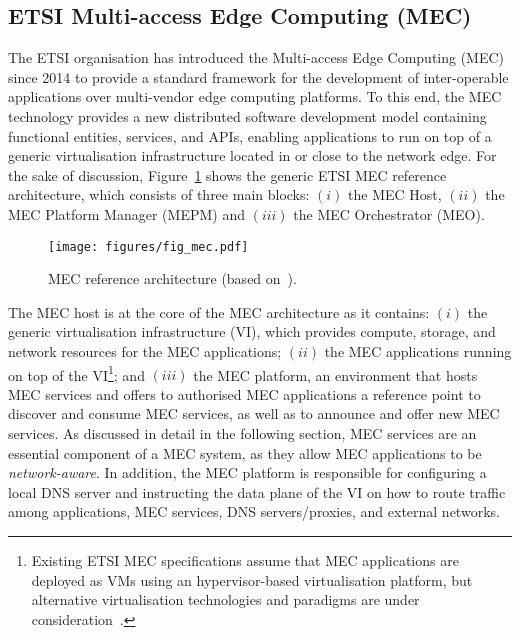 \subsection{ETSI Multi-access Edge Computing (MEC)}
\label{sec:mec}
\noindent
The ETSI organisation has introduced the Multi-access Edge Computing (MEC) since 2014 to provide a standard framework for the development of inter-operable applications over multi-vendor edge computing platforms. To this end, the MEC technology provides a new distributed software development model containing functional entities, services, and APIs, enabling applications to run on top of a generic virtualisation infrastructure located in or close to the network edge. For the sake of discussion,  Figure~\ref{fig:mec_gen_arch} shows the generic ETSI MEC reference architecture, which consists of three main blocks: $(i)$ the MEC Host, $(ii)$ the MEC Platform Manager (MEPM) and $(iii)$ the MEC Orchestrator (MEO). 
%
\begin{figure}[ht]
\centering
\texttt{[image: figures/fig\_mec.pdf]}
\caption{MEC reference architecture (based on~\cite{MEC003}).}
\label{fig:mec_gen_arch}
\vspace{-0.2cm}
\end{figure}

The MEC host is at the core of the MEC architecture as it contains: $(i)$ the generic virtualisation infrastructure (VI), which provides compute, storage, and network resources for the MEC applications; $(ii)$ the MEC applications running on top of the VI\footnote{Existing ETSI MEC specifications assume that MEC applications are deployed as VMs using an hypervisor-based virtualisation platform, but alternative virtualisation technologies and paradigms are under consideration~\cite{MEC027}.}; and $(iii)$ the MEC platform, an environment that hosts MEC services and offers to authorised MEC applications a reference point to discover and consume MEC services, as well as to announce and offer new MEC services. As discussed in detail in the following section, MEC services are an essential component of a MEC system, as they allow MEC applications to be \textit{network-aware}. In addition, the MEC platform is responsible for configuring a local DNS server and instructing the data plane of the VI on how to route traffic among applications, MEC services, DNS servers/proxies, and external networks. 

